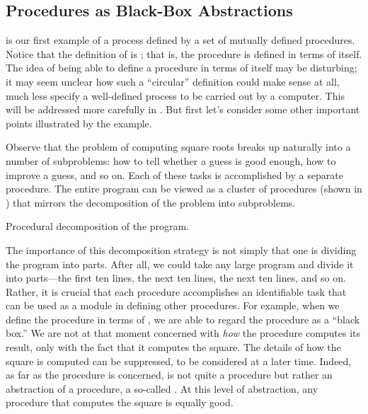 \subsection{Procedures as Black-Box Abstractions}
\label{Section 1.1.8}

 is our first example of a process defined by a set of mutually
defined procedures.  Notice that the definition of  is
; that is, the procedure is defined in terms of itself.  The
idea of being able to define a procedure in terms of itself may be disturbing;
it may seem unclear how such a ``circular'' definition could make sense at all,
much less specify a well-defined process to be carried out by a computer.  This
will be addressed more carefully in .  But first let's
consider some other important points illustrated by the  example.

Observe that the problem of computing square roots breaks up naturally into a
number of subproblems: how to tell whether a guess is good enough, how to
improve a guess, and so on.  Each of these tasks is accomplished by a separate
procedure.  The entire  program can be viewed as a cluster of
procedures (shown in ) that mirrors the decomposition of the
problem into subproblems.

\begin{imageFigure}{Procedural decomposition of the  program.}
  
\end{imageFigure}

The importance of this decomposition strategy is not simply that one is dividing
the program into parts.  After all, we could take any large program and divide
it into parts---the first ten lines, the next ten lines, the next ten lines, and
so on.  Rather, it is crucial that each procedure accomplishes an identifiable
task that can be used as a module in defining other procedures. For example,
when we define the  procedure in terms of ,
we are able to regard the  procedure as a ``black box.''  We are
not at that moment concerned with \emph{how} the procedure computes its result,
only with the fact that it computes the square.  The details of how the square
is computed can be suppressed, to be considered at a later time.  Indeed, as far
as the  procedure is concerned,  is not
quite a procedure but rather an abstraction of a procedure, a so-called
.  At this level of abstraction, any procedure
that computes the square is equally good.

